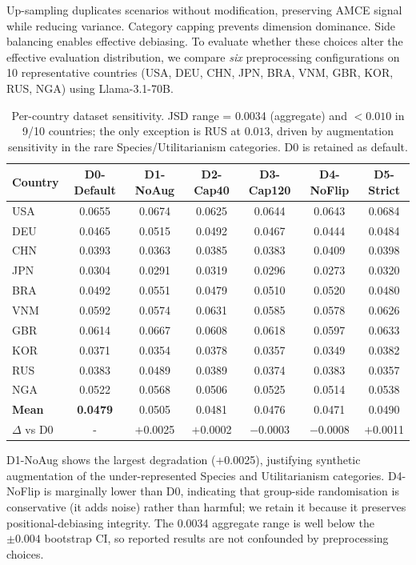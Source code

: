 \documentclass{article}
\begin{document}
Up-sampling duplicates scenarios without modification, preserving AMCE signal while reducing variance. Category capping prevents dimension dominance. Side balancing enables effective debiasing. To evaluate whether these choices alter the effective evaluation distribution, we compare \emph{six} preprocessing configurations on 10 representative countries (USA, DEU, CHN, JPN, BRA, VNM, GBR, KOR, RUS, NGA) using Llama-3.1-70B.

\begin{table}[H]\centering\small
\caption{Per-country dataset sensitivity. JSD range = 0.0034 (aggregate) and
$<0.010$ in 9/10 countries; the only exception is RUS at $0.013$, driven by
augmentation sensitivity in the rare Species/Utilitarianism categories.
D0 is retained as default.}
\label{tab:dataset_sens}\scriptsize
\begin{tabular}{lcccccc}\toprule
Country & D0-Default & D1-NoAug & D2-Cap40 & D3-Cap120 & D4-NoFlip & D5-Strict \\\midrule
USA & 0.0655 & 0.0674 & 0.0625 & 0.0644 & 0.0643 & 0.0684 \\
DEU & 0.0465 & 0.0515 & 0.0492 & 0.0467 & 0.0444 & 0.0484 \\
CHN & 0.0393 & 0.0363 & 0.0385 & 0.0383 & 0.0409 & 0.0398 \\
JPN & 0.0304 & 0.0291 & 0.0319 & 0.0296 & 0.0273 & 0.0320 \\
BRA & 0.0492 & 0.0551 & 0.0479 & 0.0510 & 0.0520 & 0.0480 \\
VNM & 0.0592 & 0.0574 & 0.0631 & 0.0585 & 0.0578 & 0.0626 \\
GBR & 0.0614 & 0.0667 & 0.0608 & 0.0618 & 0.0597 & 0.0633 \\
KOR & 0.0371 & 0.0354 & 0.0378 & 0.0357 & 0.0349 & 0.0382 \\
RUS & 0.0383 & 0.0489 & 0.0389 & 0.0374 & 0.0383 & 0.0357 \\
NGA & 0.0522 & 0.0568 & 0.0506 & 0.0525 & 0.0514 & 0.0538 \\\midrule
\textbf{Mean} & \textbf{0.0479} & 0.0505 & 0.0481 & 0.0476 & 0.0471 & 0.0490 \\
$\Delta$ vs D0 & - & $+$0.0025 & $+$0.0002 & $-$0.0003 & $-$0.0008 & $+$0.0011 \\\bottomrule
\end{tabular}
\end{table}

D1-NoAug shows the largest degradation ($+$0.0025), justifying synthetic augmentation of the under-represented Species and Utilitarianism categories. D4-NoFlip is marginally lower than D0, indicating that group-side randomisation is conservative (it adds noise) rather than harmful; we retain it because it preserves positional-debiasing integrity. The 0.0034 aggregate range is well below the $\pm0.004$ bootstrap CI, so reported results are not confounded by preprocessing choices.
\end{document}

